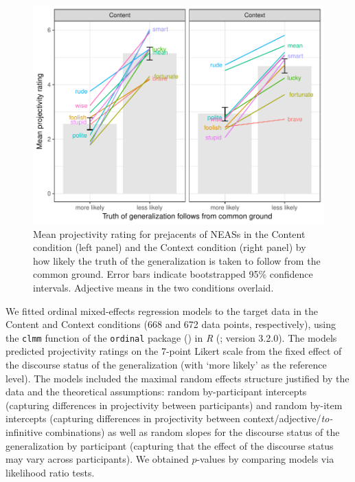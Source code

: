 \documentclass[11pt,fleqn]{article}
\newcommand{\6}{\mbox{$[\hspace*{-.6mm}[$}}
\newcommand{\9}{\mbox{$]\hspace*{-.6mm}]$}}
\begin{document}
\begin{figure}[H]
\begin{center}
\includegraphics[scale=.75]{../exp2-projection/graphs/mean-certainty-ratings}

\caption{Mean projectivity rating for prejacents of NEASs in the Content condition (left panel) and the Context condition (right panel) by how likely the truth of the generalization is taken to follow from the common ground. Error bars indicate bootstrapped 95\% confidence intervals. Adjective means in the two conditions overlaid.}\label{f-condis}
\end{center}
\end{figure}

We fitted ordinal mixed-effects regression models to the target data in the Content and Context conditions (668 and 672 data points, respectively), using the {\tt clmm} function of the {\tt ordinal} package (\citealt{Christensen2013}) in {\em R} (\citealt{r}; version 3.2.0). The models predicted projectivity ratings on the 7-point Likert scale from the fixed effect of the discourse status of the generalization (with `more likely' as the reference level). The models included the maximal random effects structure justified by the data and the theoretical assumptions: random by-participant intercepts (capturing differences in projectivity between participants) and random by-item intercepts (capturing differences in projectivity between context/adjective/{\em to-}infinitive combinations) as well as random slopes for the discourse status of the generalization by participant  (capturing that the effect of the discourse status may vary across participants). We obtained $p$-values by comparing models via likelihood ratio tests.
\end{document}
